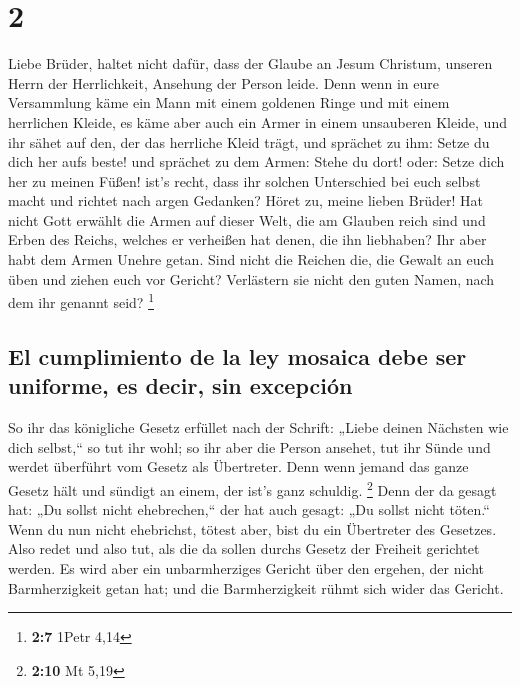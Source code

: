 \hypertarget{section-1}{%
\section{2}\label{section-1}}

 Liebe Brüder, haltet nicht dafür, dass der Glaube an
Jesum Christum, unseren Herrn der Herrlichkeit, Ansehung der Person
leide.  Denn wenn in eure Versammlung käme ein Mann mit
einem goldenen Ringe und mit einem herrlichen Kleide, es käme aber auch
ein Armer in einem unsauberen Kleide,  und ihr sähet auf
den, der das herrliche Kleid trägt, und sprächet zu ihm: Setze du dich
her aufs beste! und sprächet zu dem Armen: Stehe du dort! oder: Setze
dich her zu meinen Füßen!  ist's recht, dass ihr solchen
Unterschied bei euch selbst macht und richtet nach argen Gedanken?
 Höret zu, meine lieben Brüder! Hat nicht Gott erwählt die
Armen auf dieser Welt, die am Glauben reich sind und Erben des Reichs,
welches er verheißen hat denen, die ihn liebhaben?  Ihr
aber habt dem Armen Unehre getan. Sind nicht die Reichen die, die Gewalt
an euch üben und ziehen euch vor Gericht?  Verlästern sie
nicht den guten Namen, nach dem ihr genannt seid? \footnote{\textbf{2:7}
  1Petr 4,14}

\hypertarget{el-cumplimiento-de-la-ley-mosaica-debe-ser-uniforme-es-decir-sin-excepciuxf3n}{%
\subsection{El cumplimiento de la ley mosaica debe ser uniforme, es
decir, sin
excepción}\label{el-cumplimiento-de-la-ley-mosaica-debe-ser-uniforme-es-decir-sin-excepciuxf3n}}

 So ihr das königliche Gesetz erfüllet nach der Schrift:
„Liebe deinen Nächsten wie dich selbst,`` so tut ihr wohl;
 so ihr aber die Person ansehet, tut ihr Sünde und werdet
überführt vom Gesetz als Übertreter.  Denn wenn jemand
das ganze Gesetz hält und sündigt an einem, der ist's ganz schuldig.
\footnote{\textbf{2:10} Mt 5,19}  Denn der da gesagt hat:
„Du sollst nicht ehebrechen,`` der hat auch gesagt: „Du sollst nicht
töten.`` Wenn du nun nicht ehebrichst, tötest aber, bist du ein
Übertreter des Gesetzes.  Also redet und also tut, als
die da sollen durchs Gesetz der Freiheit gerichtet werden.
 Es wird aber ein unbarmherziges Gericht über den
ergehen, der nicht Barmherzigkeit getan hat; und die Barmherzigkeit
rühmt sich wider das Gericht.

